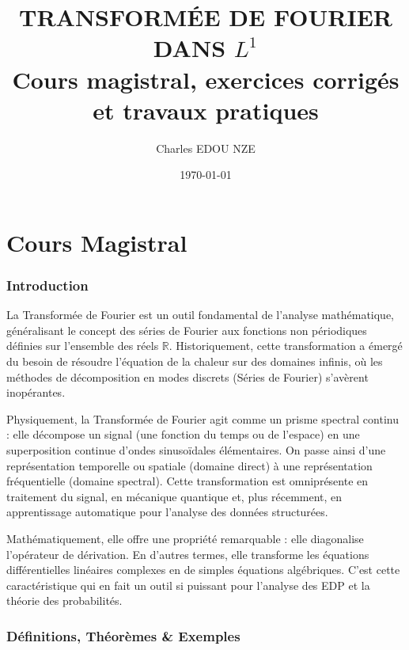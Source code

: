\documentclass[11pt,a4paper]{article}
\title{\Huge TRANSFORMÉE DE FOURIER DANS $L^1$ \\ \large Cours magistral, exercices corrigés et travaux pratiques}
\author{\Large Charles EDOU NZE}
\date{\today}
\begin{document}
\maketitle
\tableofcontents
\newpage

\part{Cours Magistral}



\section{Introduction}

La Transformée de Fourier est un outil fondamental de l'analyse mathématique, généralisant le concept des séries de Fourier aux fonctions non périodiques définies sur l'ensemble des réels $\mathbb{R}$. Historiquement, cette transformation a émergé du besoin de résoudre l'équation de la chaleur sur des domaines infinis, où les méthodes de décomposition en modes discrets (Séries de Fourier) s'avèrent inopérantes.

Physiquement, la Transformée de Fourier agit comme un prisme spectral continu : elle décompose un signal (une fonction du temps ou de l'espace) en une superposition continue d'ondes sinusoïdales élémentaires. On passe ainsi d'une représentation temporelle ou spatiale (domaine direct) à une représentation fréquentielle (domaine spectral). Cette transformation est omniprésente en traitement du signal, en mécanique quantique et, plus récemment, en apprentissage automatique pour l'analyse des données structurées.

Mathématiquement, elle offre une propriété remarquable : elle diagonalise l'opérateur de dérivation. En d'autres termes, elle transforme les équations différentielles linéaires complexes en de simples équations algébriques. C'est cette caractéristique qui en fait un outil si puissant pour l'analyse des EDP et la théorie des probabilités.

\section{Définitions, Théorèmes \& Exemples}
\end{document}
